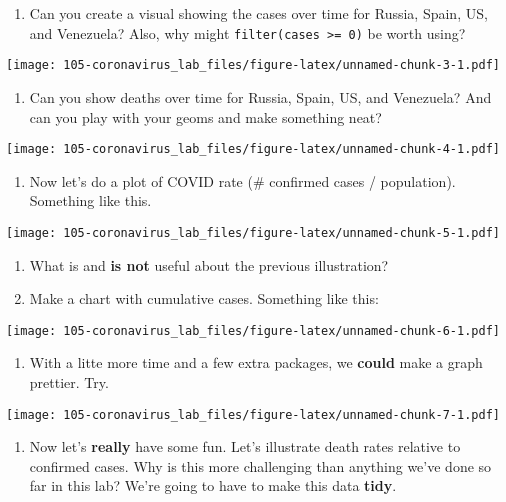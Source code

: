 \documentclass[
]{book}
\providecommand{\tightlist}{%
  \setlength{\itemsep}{0pt}\setlength{\parskip}{0pt}}
\begin{document}
\begin{enumerate}
\def\labelenumi{\arabic{enumi}.}
\tightlist
\item
  Can you create a visual showing the cases over time for Russia, Spain, US, and Venezuela?
  Also, why might \texttt{filter(cases\ \textgreater{}=\ 0)} be worth using?
\end{enumerate}

\texttt{[image: 105-coronavirus\_lab\_files/figure-latex/unnamed-chunk-3-1.pdf]}

\begin{enumerate}
\def\labelenumi{\arabic{enumi}.}
\setcounter{enumi}{1}
\tightlist
\item
  Can you show deaths over time for Russia, Spain, US, and Venezuela? And can you play with your geoms and make something neat?
\end{enumerate}

\texttt{[image: 105-coronavirus\_lab\_files/figure-latex/unnamed-chunk-4-1.pdf]}

\begin{enumerate}
\def\labelenumi{\arabic{enumi}.}
\setcounter{enumi}{2}
\tightlist
\item
  Now let's do a plot of COVID rate (\# confirmed cases / population). Something like this.
\end{enumerate}

\texttt{[image: 105-coronavirus\_lab\_files/figure-latex/unnamed-chunk-5-1.pdf]}

\begin{enumerate}
\def\labelenumi{\arabic{enumi}.}
\setcounter{enumi}{3}
\item
  What is and \textbf{is not} useful about the previous illustration?
\item
  Make a chart with cumulative cases. Something like this:
\end{enumerate}

\texttt{[image: 105-coronavirus\_lab\_files/figure-latex/unnamed-chunk-6-1.pdf]}

\begin{enumerate}
\def\labelenumi{\arabic{enumi}.}
\setcounter{enumi}{5}
\tightlist
\item
  With a litte more time and a few extra packages, we \textbf{could} make a graph prettier. Try.
\end{enumerate}

\texttt{[image: 105-coronavirus\_lab\_files/figure-latex/unnamed-chunk-7-1.pdf]}

\begin{enumerate}
\def\labelenumi{\arabic{enumi}.}
\setcounter{enumi}{6}
\tightlist
\item
  Now let's \textbf{really} have some fun. Let's illustrate death rates relative to confirmed cases. Why is this more challenging than anything we've done so far in this lab? We're going to have to make this data \textbf{tidy}.
\end{enumerate}
\end{document}
